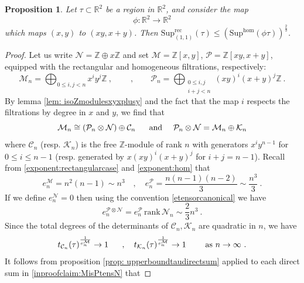 \documentclass[a4paper,10pt]{amsart}
\newtheorem{prop}[thm]{Proposition}
\theoremstyle{definition}
\theoremstyle{remark}
\numberwithin{equation}{section}
\newcommand{\To}{\longrightarrow}
\newcommand{\Z}{\mathbb Z}
\newcommand{\R}{\mathbb R}
\newcommand{\rec}{\mathrm{rec}}
\newcommand{\ts}{\mathrm{Sup}}
\newcommand{\rank}{\mathrm{rank}}
\newcommand{\0}{\color{blue}{\mathsf{0}}}
\begin{document}
 
 \begin{prop} \label{prop: mapxyxplusy} 
  Let $\tau \subset \R^2$ be a region in $\R^2$, and consider the map 
  \[ \phi: \R^2 \To \R^2\]
  which maps $(x,y)$ to $(xy, x+y)$. Then $ \ts^{\rec}_{(1,1)} (   \tau ) \leq (\ts^{\hom}( \phi \tau))^{\frac{2}{3}}$. 
  \end{prop}
  \begin{proof} 
  Let us write $\mathcal{N} = \Z \oplus x \Z$ and  
 set $\mathcal{M}= \Z[x,y]$, $\mathcal{P}=\Z[xy,x+y]$,   equipped with the rectangular and homogeneous  filtrations, respectively:
\[  \mathcal{M}_n  =   \bigoplus_{0\leq i , j< n} x^i y^j \Z \ , \qquad \ , \qquad 
  \mathcal{P}_n  =  \bigoplus_{\substack{0\leq i,j \\  i+j< n}} (xy)^i (x+y)^j \Z \ .  \nonumber 
 \]
By lemma  \ref{lem: isoZmodulesxyxplusy} and the fact that the map $i$ respects the filtrations by degree in $x$ and $y$, we find that
\begin{equation}\label{inproofclaim:MisPtensN}  \mathcal{M}_n \cong   \left( \mathcal{P}_n \otimes \mathcal{N} \right)  \oplus \mathcal{C}_n \  \quad \hbox{ and } 
\quad \mathcal{P}_n \otimes \mathcal{N} = \mathcal{M}_{n} \oplus \mathcal{K}_n
\end{equation}
where $\mathcal{C}_n$ (resp.   $\mathcal{K}_n$) is the free $\Z$-module of rank $n$ with generators $x^i y^{n-1}$ for $0\leq i\leq n-1$ (resp.   
 generated  by $x  (xy)^i (x+y)^j$ for $i+j =n-1$). Recall from \eqref{exponent:rectangularcase} and \eqref{exponent:hom} that  
\[ e^{\mathcal{M}}_n =  n^2(n-1) \sim  n^3  \quad , \quad   e^{\mathcal{P}}_n =  \frac{n(n-1)(n-2)}{3} \sim \frac{n^3}{3} \ . \] 
If we define $e_n^{\mathcal{N}}=0$ then using the convention \eqref{etensorcanonical} we have 
\[ e^{\mathcal{P}\otimes \mathcal{N}}_n = e^{\mathcal{P}}_n \, \rank \,\mathcal{N}_n \sim \frac{2}{3} n^3\ .\] 
Since the total degrees of the determinants of $\mathcal{C}_n,\mathcal{K}_n$ are quadratic in $n$, we have
\[ t_{\mathcal{C}_n} (\tau )^{\frac{1}{e^{\mathcal{M}}_n}} \rightarrow  1 \  \quad \ , \quad t_{\mathcal{K}_n} (\tau)^{\frac{1}{e^{\mathcal{M}}_n}} \rightarrow 1    \qquad \hbox{ as } n\rightarrow \infty\ .  \]
It follows from  proposition \ref{prop: upperboundtaudirectsum}  applied  to each direct sum in   \eqref{inproofclaim:MisPtensN} that 

\end{proof}
\end{document}
